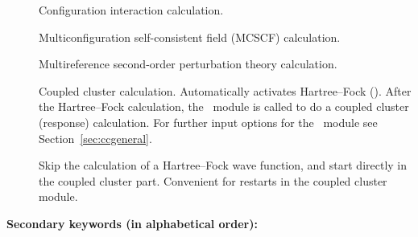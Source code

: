 \begin{description}
\item[]
  Configuration interaction calculation.

\item[]
  Multiconfiguration self-consistent field (MCSCF) calculation.

\item[]
  Multireference second-order perturbation theory calculation.

\item[]
  Coupled cluster calculation. Automatically activates Hartree--Fock ().
  After the Hartree--Fock calculation,
  the \cc\ module is called to do a coupled cluster (response) calculation.
  For further input options for the \cc\ module see Section~\ref{sec:ccgeneral}. 

\item[] Skip the calculation of a Hartree--Fock wave
  function, and start directly in the coupled cluster part. Convenient
  for restarts in the coupled cluster module.

\end{description}

{\bf Secondary keywords (in alphabetical order): }

